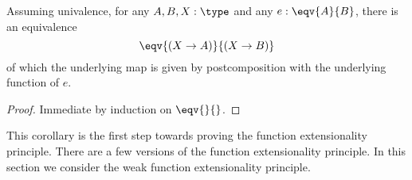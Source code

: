 \begin{comment}
\begin{prop}
Suppose that $\type$ is a univalent universe and let 
\begin{equation*}
D:\prod\{A,B:\type\},\ (A\simeq B)\to\type
\end{equation*}
be a dependent type over $\simeq$. If there is a term
\begin{equation*}
d:\prod(A:\type),\ D(\mathsf{idEquiv}_A)
\end{equation*}
then there is a section
\begin{equation*}
J(D,d):\prod\{A,B:\type\}(e:A\simeq B),\ D(e)
\end{equation*}
such that $J(D,d,\mathsf{idEquiv}_A)= d(A)$. 
\end{prop}

\begin{proof}
Suppose we have $D$ and $d$ as in the statement of the proposition and let $e:A\simeq B$ be an equivalence. Note that by the univalence axiom, there is a path
\begin{equation*}
\upsilon(A,B)(\upsilon(A,B)^{-1}(e))= e
\end{equation*}
and hence we can find a term of type $D(e)$ by finding a term of type 
\begin{equation*}
D(\upsilon(A,B)(\upsilon(A,B)^{-1}(e))).
\end{equation*}
Then it is clearly enough to find a term of type $D(\upsilon(A,B,p))$ for any $p:A= B$. Now we can apply path induction, so it suffices to find a term of $D(\upsilon(A,A,\refl{A}))$. Recall that $\upsilon(A,A,\refl{A})$ is defined to be $\mathsf{idEquiv}_A$, so we find $d(A)$ here.
\end{proof}
\end{comment}

\begin{lem}
Assuming univalence, for any $A,B,X:\type$ and any $e:\eqv{A}{B}$, there is an equivalence
\begin{equation*}
\eqv{(X\to A)}{(X\to B)}
\end{equation*}
of which the underlying map is given by postcomposition with the underlying function of $e$.
\end{lem}

\begin{proof}
Immediate by induction on $\eqv{}{}$. 
\end{proof}

This corollary is the first step towards proving the function extensionality principle. There are a few versions of the function extensionality principle. In this section we consider the weak function extensionality principle.

